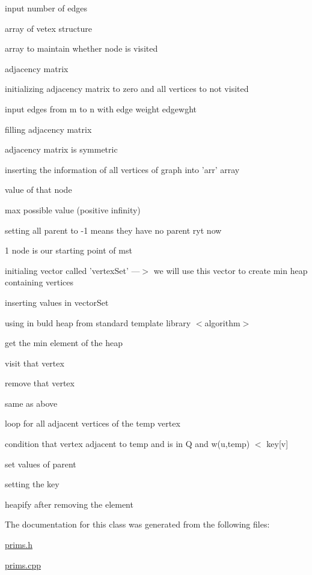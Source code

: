 input number of edges

array of vetex structure

array to maintain whether node is visited

adjacency matrix

initializing adjacency matrix to zero and all vertices to not visited

input edges from m to n with edge weight edgewght

filling adjacency matrix

adjacency matrix is symmetric

inserting the information of all vertices of graph into 'arr' array

value of that node

max possible value (positive infinity)

setting all parent to -\/1 means they have no parent ryt now

1 node is our starting point of mst

initialing vector called 'vertex\-Set' ---$>$ we will use this vector to create min heap containing vertices

inserting values in vector\-Set

using in buld heap from standard template library $<$algorithm$>$

get the min element of the heap

visit that vertex

remove that vertex

same as above

loop for all adjacent vertices of the temp vertex

condition that vertex adjacent to temp and is in Q and w(u,temp) $<$ key\mbox{[}v\mbox{]}

set values of parent

setting the key

heapify after removing the element 

The documentation for this class was generated from the following files\-:\begin{DoxyCompactItemize}
\item 
\hyperlink{prims_8h}{prims.\-h}\item 
\hyperlink{prims_8cpp}{prims.\-cpp}\end{DoxyCompactItemize}
